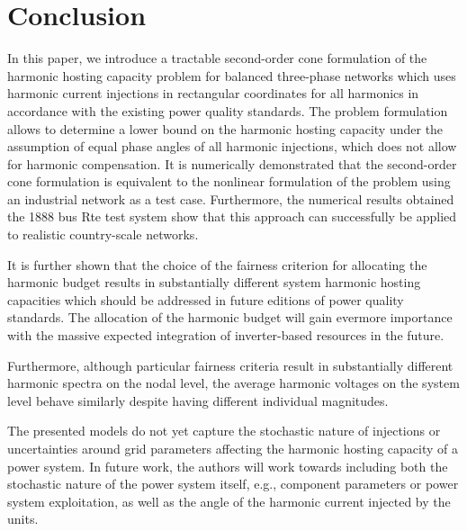 \section{Conclusion}
\label{sec:conclusion}

In this paper, we introduce a tractable second-order cone formulation of the harmonic hosting capacity problem for balanced three-phase networks which uses harmonic current injections in rectangular coordinates for all harmonics in accordance with the existing power quality standards. The problem formulation allows to determine a lower bound on the harmonic hosting capacity under the assumption of equal phase angles of all harmonic injections, which does not allow for harmonic compensation. It is numerically demonstrated that the second-order cone formulation is equivalent to the nonlinear formulation of the problem using an industrial network as a test case.  Furthermore, the numerical results obtained the 1888 bus Rte test system show that this approach can successfully be applied to realistic country-scale networks.  

It is further shown that the choice of the fairness criterion for allocating the harmonic budget results in substantially different system harmonic hosting capacities which should be addressed in future editions of power quality standards. The allocation of the harmonic budget will gain evermore importance with the massive expected integration of inverter-based resources in the future.

Furthermore, although particular fairness criteria result in substantially different harmonic spectra on the nodal level, the average harmonic voltages on the system level behave similarly despite having different individual magnitudes.

The presented models do not yet capture the stochastic nature of injections or uncertainties around grid parameters affecting the harmonic hosting capacity of a power system. In future work, the authors will work towards including both the stochastic nature of the power system itself, e.g., component parameters or power system exploitation, as well as the angle of the harmonic current injected by the units.